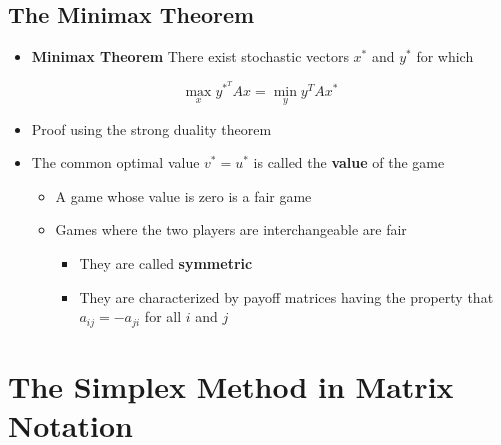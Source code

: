 \documentclass[11pt]{article}
\begin{document}
\subsection{The Minimax Theorem}
\label{sec:org94e0777}
\begin{itemize}
\item \textbf{Minimax Theorem} There exist stochastic vectors \(x^*\) and \(y^*\) for which
\end{itemize}
\begin{equation}
  \max_x y^{* ^T} Ax = \min_y y^T A x^*
\end{equation}
\begin{itemize}
\item Proof using the strong duality theorem

\item The common optimal value \(v^* = u^*\) is called the \textbf{value} of the game
\begin{itemize}
\item A game whose value is zero is a fair game
\item Games where the two players are interchangeable are fair
\begin{itemize}
\item They are called \textbf{symmetric}
\item They are characterized by payoff matrices having the property that \(a_{ij} = -a_{ji}\) for all \(i\) and \(j\)
\end{itemize}
\end{itemize}
\end{itemize}

\section{The Simplex Method in Matrix Notation}
\label{sec:org845ae6c}
\end{document}
